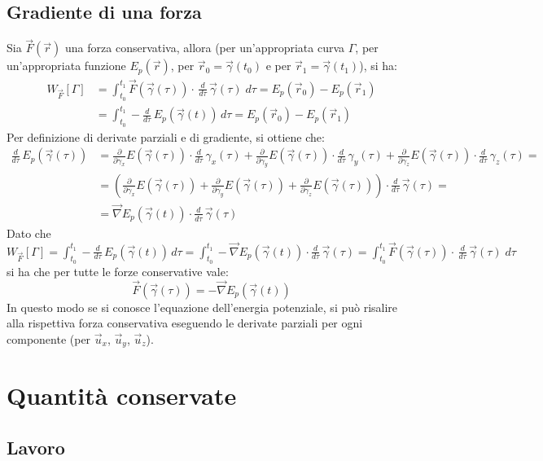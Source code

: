 \documentclass[a4paper]{article}
\newcommand\ux{\vec{u}_x}
\newcommand\uy{\vec{u}_y}
\newcommand\uz{\vec{u}_z}
\newcommand\dtau{\frac{d}{d\tau}\,}
\begin{document}
\subsection{Gradiente di una forza}
Sia \(\vec{F}(\vec{r})\) una forza conservativa, allora (per un'appropriata curva \(\Gamma\), per un'appropriata funzione \(E_p(\vec{r})\), per \(\vec{r}_0 = \vec{\gamma}(t_0)\) e per \(\vec{r}_1 = \vec{\gamma}(t_1)\)), si ha:
\begin{align*}
	W_{\vec{F}}[\Gamma] &= \int_{t_0}^{t_1} \vec{F}(\vec{\gamma}(\tau)) \cdot \, \dtau \vec{\gamma}(\tau) \; d\tau = E_p(\vec{r}_0) - E_p(\vec{r}_1) \\
	&= \int_{t_0}^{t_1} -\dtau E_p(\vec{\gamma}(t)) \, d\tau = E_p(\vec{r}_0) - E_p(\vec{r}_1)
\end{align*}
Per definizione di derivate parziali e di gradiente, si ottiene che:
\begin{align*}
	\dtau E_p(\vec{\gamma}(\tau)) &= \frac{\partial}{\partial \gamma_x} E(\vec{\gamma}(\tau)) \cdot \dtau \gamma_x(\tau) + \frac{\partial}{\partial \gamma_y} E(\vec{\gamma}(\tau)) \cdot \dtau \gamma_y(\tau) + \frac{\partial}{\partial \gamma_z} E(\vec{\gamma}(\tau)) \cdot \dtau \gamma_z(\tau) = \\
	&= \left( \frac{\partial}{\partial \gamma_x} E(\vec{\gamma}(\tau)) + \frac{\partial}{\partial \gamma_y} E(\vec{\gamma}(\tau)) + \frac{\partial}{\partial \gamma_z} E(\vec{\gamma}(\tau)) \right) \cdot \dtau \vec{\gamma}(\tau) = \\
	&= \vec{\nabla} E_p(\vec{\gamma}(t)) \cdot \dtau \vec{\gamma}(\tau)
\end{align*}
Dato che \(\displaystyle W_{\vec{F}}[\Gamma] = \int_{t_0}^{t_1} -\dtau E_p(\vec{\gamma}(t)) \, d\tau = \int_{t_0}^{t_1} -\vec{\nabla} E_p(\vec{\gamma}(t)) \cdot \dtau \vec{\gamma}(\tau) = \int_{t_0}^{t_1} \vec{F}(\vec{\gamma}(\tau)) \cdot \, \dtau \vec{\gamma}(\tau) \; d\tau\) \\
si ha che per tutte le forze conservative vale: \[\vec{F}(\vec{\gamma}(\tau)) = -\vec{\nabla} E_p(\vec{\gamma}(t))\]
In questo modo se si conosce l'equazione dell'energia potenziale, si può risalire alla rispettiva forza conservativa eseguendo
le derivate parziali per ogni componente (per \(\ux\), \(\uy\), \(\uz\)).

\newpage

\section{Quantità conservate}
\subsection{Lavoro}
\end{document}
